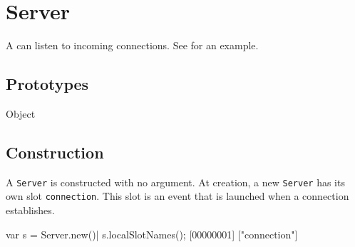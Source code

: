 
\section{Server}

A  can listen to incoming connections.  See
 for an example.

\subsection{Prototypes}
\begin{refObjects}
\item[Object]
\end{refObjects}

\subsection{Construction}

A \lstinline|Server| is constructed with no argument. At creation, a
new \lstinline|Server| has its own slot \lstinline|connection|. This
slot is an event that is launched when a connection establishes.

\begin{urbiscript}
var s = Server.new()|
s.localSlotNames();
[00000001] ["connection"]
\end{urbiscript}

